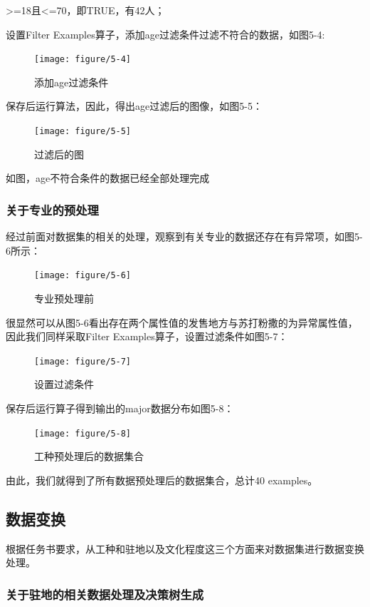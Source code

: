 >=18且<=70，即TRUE，有42人；

设置Filter Examples算子，添加age过滤条件过滤不符合的数据，如图5-4:

\begin{figure}[thbp!]
	\centering
	\texttt{[image: figure/5-4]}
	\caption{添加age过滤条件}
	\label{fig:5-4}
\end{figure}

保存后运行算法，因此，得出age过滤后的图像，如图5-5：

\begin{figure}[thbp!]
	\centering
	\texttt{[image: figure/5-5]}
	\caption{过滤后的图}
	\label{fig:5-5}
\end{figure}

如图，age不符合条件的数据已经全部处理完成

\subsubsection{ 关于专业的预处理}

经过前面对数据集的相关的处理，观察到有关专业的数据还存在有异常项，如图5-6所示：

\begin{figure}[thbp!]
	\centering
	\texttt{[image: figure/5-6]}
	\caption{专业预处理前}
	\label{fig:5-6}
\end{figure}

\newpage
很显然可以从图5-6看出存在两个属性值的发售地方与苏打粉撒的为异常属性值，因此我们同样采取Filter Examples算子，设置过滤条件如图5-7：

\begin{figure}[thbp!]
	\centering
	\texttt{[image: figure/5-7]}
	\caption{设置过滤条件}
	\label{fig:5-7}
\end{figure}

保存后运行算子得到输出的major数据分布如图5-8：

\begin{figure}[thbp!]
	\centering
	\texttt{[image: figure/5-8]}
	\caption{工种预处理后的数据集合}
	\label{fig:5-8}
\end{figure}

由此，我们就得到了所有数据预处理后的数据集合，总计40 examples。


\subsection{数据变换}
根据任务书要求，从工种和驻地以及文化程度这三个方面来对数据集进行数据变换处理。

\subsubsection{关于驻地的相关数据处理及决策树生成}

